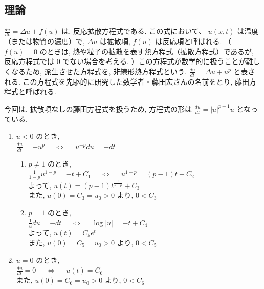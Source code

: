 \documentclass[11pt]{jsarticle}
\begin{document}
\subsection{理論}
$\displaystyle \frac{du}{dt} = \Delta u + f(u)$ は, 反応拡散方程式である. この式において、 $u(x, t)$ は温度（または物質の濃度）で, $\Delta u$ は拡散項, $f(u)$ は反応項と呼ばれる. （ $f(u) = 0$ のときは, 熱や粒子の拡散を表す熱方程式（拡散方程式）であるが, 反応方程式では $0$ でない場合を考える. ）この方程式が数学的に扱うことが難しくなるため, 派生させた方程式を, 非線形熱方程式という. $\displaystyle \frac{du}{dt} = \Delta u + u^{p}$ と表される. この方程式を先駆的に研究した数学者・藤田宏さんの名前をとり, 藤田方程式と呼ばれる. \par
今回は, 拡散項なしの藤田方程式を扱うため, 方程式の形は $\displaystyle \frac{du}{dt} = |u|^{p-1}u$ となっている. 
\begin{enumerate}
\renewcommand{\theenumi}{\roman{enumi}}
\renewcommand{\labelenumi}{\theenumi)}
\renewcommand{\labelenumii}{\alph{enumii})}
\item $u < 0$ のとき, \\
$\displaystyle \frac{du}{dt} = -u^{p}$ \ \ $\Leftrightarrow$ \ \ $u^{-p} du = -dt$ \\
\begin{enumerate}
\item $p \neq 1$ のとき, \\
$\displaystyle \frac{1}{1-p}u^{1-p} = -t + C_{1}$ \ \ $\Leftrightarrow$ \ \ $u^{1-p} = (p-1)t + C_{2}$ \\
よって, $\displaystyle u(t) = (p-1)t^{\frac{1}{1-p}} + C_{3}$ \\
また, $u(0) = C_{3} = u_{0} > 0$ より, $0 < C_{3}$ \\
\item $p = 1$ のとき, \\
$\displaystyle \frac{1}{u}du = -dt$ \ \ $\Leftrightarrow$  \ \ $\log{|u|} = -t + C_{4}$ \\
よって, $\displaystyle u(t) = C_{5}e^{t}$ \\
また, $u(0) = C_{5} = u_{0} > 0$ より, $0 < C_{5}$ \\
\end{enumerate}

\item $u = 0$ のとき, \\
$\displaystyle \frac{du}{dt} = 0$ \ \ $\Leftrightarrow$ \ \ $u(t) = C_{6}$ \\
また, $u(0) = C_{6} = u_{0} > 0$ より, $0 < C_{6}$ \\


\end{enumerate}
\end{document}

